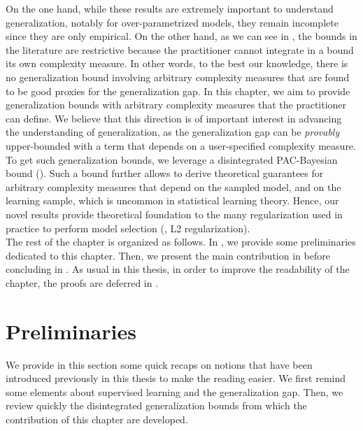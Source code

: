 On the one hand, while these results are extremely important to understand generalization, notably for over-parametrized models, they remain incomplete since they are only empirical.
On the other hand, as we can see in , the bounds in the literature are restrictive because the practitioner cannot integrate in a bound its own complexity measure.
In other words, to the best our knowledge, there is no generalization bound involving arbitrary complexity measures that are found to be good proxies for the generalization gap.
In this chapter, we aim to provide generalization bounds with arbitrary complexity measures that the practitioner can define.
We believe that this direction is of important interest in advancing the understanding of generalization, as the generalization gap can be {\it provably} upper-bounded with a term that depends on a user-specified complexity measure.
To get such generalization bounds, we leverage a disintegrated PAC-Bayesian bound ().
Such a bound further allows to derive theoretical guarantees for arbitrary complexity measures that depend on the sampled model, and on the learning sample, which is uncommon in statistical learning theory.
Hence, our novel results provide theoretical foundation to the many regularization used in practice to perform model selection (\eg, L2 regularization).\\

The rest of the chapter is organized as follows. 
In , we provide some preliminaries dedicated to this chapter.
Then, we present the main contribution in  before concluding in .
As usual in this thesis, in order to improve the readability of the chapter, the proofs are deferred in .

\section{Preliminaries}
\label{chap:dis-mu:sec:setting}

We provide in this section some quick recaps on notions that have been introduced previously in this thesis to make the reading easier. 
We first remind some elements about supervised learning and the generalization gap.
Then, we review quickly the disintegrated generalization bounds from which the contribution of this chapter are developed.

